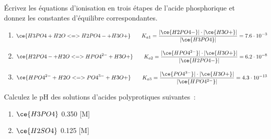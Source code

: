 \documentclass[
  11pt,
  a4paper,
  openany]{book}
\providecommand{\tightlist}{%
  \setlength{\itemsep}{0pt}\setlength{\parskip}{0pt}}
\begin{document}
\begin{Exercise}
Écrivez les équations d'ionisation en trois étapes de l'acide phosphorique et donnez les constantes d'équilibre correspondantes.

\end{Exercise}

\begin{Answer}

\begin{enumerate}
\def\labelenumi{\arabic{enumi}.}
\tightlist
\item
  \[
  \begin{split}
  \ce{H3PO4 + H2O <=> H2PO4- + H3O+}
  \end{split}
  \qquad
  \begin{split}
  K_{a1} = \frac{|\ce{H2PO4-}| \cdot |\ce{H3O+}|}{|\ce{H3PO4}|} = 7.6 \cdot 10^{-3}
  \end{split}
  \]
\item
  \[
  \begin{split}
  \ce{H2PO4- + H2O <=> HPO4^{2-} + H3O+}
  \end{split}
  \qquad
  \begin{split}
  K_{a2} = \frac{|\ce{HPO4^{2-}}| \cdot |\ce{H3O+}|}{|\ce{H2PO4-}|} = 6.2 \cdot 10^{-8}
  \end{split}
  \]
\item
  \[
  \begin{split}
  \ce{HPO4^{2-} + H2O <=> PO4^{3-} + H3O+}
  \end{split}
  \qquad
  \begin{split}
  K_{a3} = \frac{|\ce{PO4^{3-}}| \cdot |\ce{H3O+}|}{|\ce{HPO4^{2-}}|} = 4.3 \cdot 10^{-13}
  \end{split}
  \]
\end{enumerate}

\end{Answer}

\clearpage

\begin{Exercise}

Calculez le pH des solutions d'acides polyprotiques suivantes~:

\begin{enumerate}
\def\labelenumi{\alph{enumi}.}
\tightlist
\item
  \(\ce{H3PO4}\) 0.350 {[}M{]}
\item
  \(\ce{H2SO4}\) 0.125 {[}M{]}
\end{enumerate}

\end{Exercise}
\end{document}
